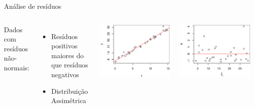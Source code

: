 \documentclass{beamer}\usepackage[]{graphicx}\usepackage[]{color}
\newenvironment{knitrout}{}{} %
\renewenvironment{knitrout}{\setlength{\topsep}{0mm}}{}
\begin{document}
\begin{frame}{Análise de resíduos}

\begin{columns}[c]

\small

Dados com resíduos não-normais: 
\begin{itemize}
\item Resíduos positivos maiores do que resíduos negativos 
\item Distribuição Assimétrica 
\end{itemize}


\begin{knitrout}
\color{fgcolor}
\includegraphics[width=1\linewidth]{figure/r3-1} 

\includegraphics[width=1\linewidth]{figure/r3-2} 

\end{knitrout}
\end{columns}

\end{frame}
\end{document}

